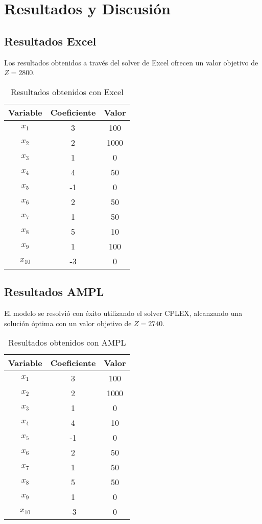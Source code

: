 \documentclass[
	spanish, %
	oneside
]{article}
\begin{document}
\section{Resultados y Discusión}

\subsection{Resultados Excel}
Los resultados obtenidos a través del solver de Excel ofrecen un valor objetivo de \( Z = 2800 \).

\begin{table}[h]
    \centering
    \begin{tabular}{|c|c|c|}
        \hline
        Variable & Coeficiente & Valor \\
        \hline
        \( x_1 \) & 3 & 100 \\
        \( x_2 \) & 2 & 1000 \\
        \( x_3 \) & 1 & 0 \\
        \( x_4 \) & 4 & 50 \\
        \( x_5 \) & -1 & 0 \\
        \( x_6 \) & 2 & 50 \\
        \( x_7 \) & 1 & 50 \\
        \( x_8 \) & 5 & 10 \\
        \( x_9 \) & 1 & 100 \\
        \( x_{10} \) & -3 & 0 \\
        \hline
    \end{tabular}
    \caption{Resultados obtenidos con Excel}
\end{table}

\subsection{Resultados AMPL}
El modelo se resolvió con éxito utilizando el solver CPLEX, alcanzando una solución óptima con un valor objetivo de \( Z = 2740 \).

\begin{table}[h]
    \centering
    \begin{tabular}{|c|c|c|}
        \hline
        Variable & Coeficiente & Valor \\
        \hline
        \( x_1 \) & 3 & 100 \\
        \( x_2 \) & 2 & 1000 \\
        \( x_3 \) & 1 & 0 \\
        \( x_4 \) & 4 & 10 \\
        \( x_5 \) & -1 & 0 \\
        \( x_6 \) & 2 & 50 \\
        \( x_7 \) & 1 & 50 \\
        \( x_8 \) & 5 & 50 \\
        \( x_9 \) & 1 & 0 \\
        \( x_{10} \) & -3 & 0 \\
        \hline
    \end{tabular}
    \caption{Resultados obtenidos con AMPL}
\end{table}
\end{document}
